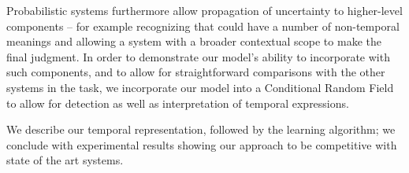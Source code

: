 Probabilistic systems furthermore allow propagation of uncertainty
	to higher-level components -- for example recognizing that  could
	have a number of non-temporal meanings and allowing a system with a broader
	contextual scope to make the final judgment.
In order to demonstrate our model's ability to incorporate with such components,
	and to allow for straightforward comparisons with the other systems in the
	\tempeval task, we incorporate our model into a Conditional Random Field
	\cite{key:2001lafferty-crf} to allow for detection as well as interpretation
	of temporal expressions.

We describe our temporal representation,
	followed by the learning algorithm; 
	we conclude with experimental results showing our
	approach to be competitive with state of the art systems.


